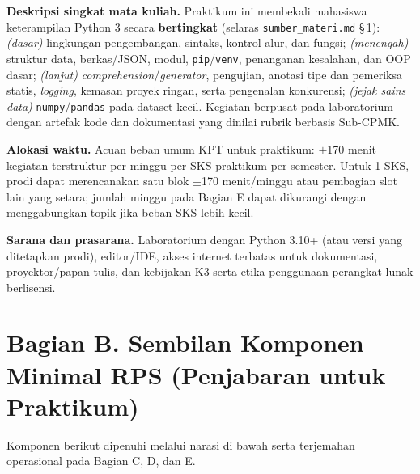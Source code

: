 \documentclass[12pt,a4paper]{article}
\begin{document}
\vspace{0.5cm}

\noindent\textbf{Deskripsi singkat mata kuliah.} Praktikum ini membekali mahasiswa keterampilan Python 3 secara \textbf{bertingkat} (selaras \texttt{sumber\_materi.md} §\,1): \textit{(dasar)} lingkungan pengembangan, sintaks, kontrol alur, dan fungsi; \textit{(menengah)} struktur data, berkas/JSON, modul, \texttt{pip}/\texttt{venv}, penanganan kesalahan, dan OOP dasar; \textit{(lanjut)} \textit{comprehension}/\textit{generator}, pengujian, anotasi tipe dan pemeriksa statis, \textit{logging}, kemasan proyek ringan, serta pengenalan konkurensi; \textit{(jejak sains data)} \texttt{numpy}/\texttt{pandas} pada dataset kecil. Kegiatan berpusat pada laboratorium dengan artefak kode dan dokumentasi yang dinilai rubrik berbasis Sub-CPMK.

\noindent\textbf{Alokasi waktu.} Acuan beban umum KPT untuk praktikum: $\pm$170 menit kegiatan terstruktur per minggu per SKS praktikum per semester. Untuk 1 SKS, prodi dapat merencanakan satu blok $\pm$170 menit/minggu atau pembagian slot lain yang setara; jumlah minggu pada Bagian E dapat dikurangi dengan menggabungkan topik jika beban SKS lebih kecil.

\noindent\textbf{Sarana dan prasarana.} Laboratorium dengan Python 3.10+ (atau versi yang ditetapkan prodi), editor/IDE, akses internet terbatas untuk dokumentasi, proyektor/papan tulis, dan kebijakan K3 serta etika penggunaan perangkat lunak berlisensi.

\vspace{0.75cm}

\section*{Bagian B. Sembilan Komponen Minimal RPS (Penjabaran untuk Praktikum)}

Komponen berikut dipenuhi melalui narasi di bawah serta terjemahan operasional pada Bagian C, D, dan E.
\end{document}
